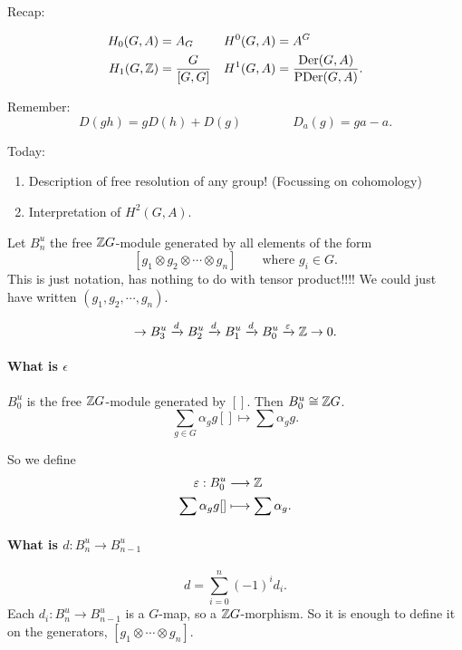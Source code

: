 
Recap:

\begin{align*}
    H_0(G, A) &= A_G & H^{0}(G, A) &= A^{G}\\
    H_1(G, \mathbb{Z}) &= \frac{G}{[G,G]} & H^{1}(G, A) &= \frac{\operatorname{Der}(G, A)}{\operatorname{PDer}(G, A)}
.\end{align*}

Remember:
\[
    D(gh) = gD(h) + D(g) \qquad \qquad D_a(g) = ga - a
.\] 

Today: 
\begin{enumerate}[(1)]
    \item Description of free resolution of any group! (Focussing on cohomology)
    \item Interpretation of $H^{2}(G, A)$.
\end{enumerate}


Let $B^u_n$ the free  $\mathbb{Z} G$-module generated by all elements of the form 
\[
    [g_1 \otimes g_2 \otimes \cdots \otimes g_n] \qquad \text{where } g_i \in G
.\] 
This is just notation, has nothing to do with tensor product!!!! We could just have written $(g_1, g_2, \cdots, g_n)$.

\[
    \to  B^u_3 
    \xrightarrow{d}  B^u_2
    \xrightarrow{d}  B^u_1
    \xrightarrow{d}  B^u_0
    \xrightarrow{\varepsilon} \mathbb{Z}
    \to  0
.\] 

\paragraph{What is $\epsilon$}
    $B^u_0$ is the free $\mathbb{Z} G$-module generated by $[]$.
    Then  $ B^u_0 \cong \mathbb{Z} G$.
    \[
        \sum_{g \in G} \alpha_g g []  \longmapsto \sum \alpha_g g
    .\] 

    So we define
    \begin{align*}
        \varepsilon: B^u_0 &\longrightarrow \mathbb{Z}  \\
        \sum \alpha_g g [] &\longmapsto \sum \alpha_g
    .\end{align*}

\paragraph{What is $d: B^u_n \to  B^u_{n-1}$}

\[
    d = \sum_{i=0}^{n} (-1)^{i} d_i
.\] 
Each $d_i: B^u_n \to  B^u_{n-1}$ is a $G$-map, so a $\mathbb{Z} G$-morphism.
So it is enough to define it on the generators, $[g_1 \otimes \cdots \otimes g_n]$.

